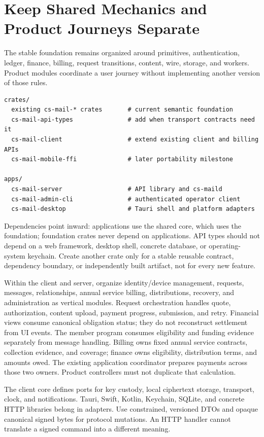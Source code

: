 \documentclass[11pt]{article}
\begin{document}
\section{Keep Shared Mechanics and Product Journeys Separate}

The stable foundation remains organized around primitives, authentication,
ledger, finance, billing, request transitions, content, wire, storage, and workers. Product modules
coordinate a user journey without implementing another version of those rules.

\begin{lstlisting}[language={}]
crates/
  existing cs-mail-* crates       # current semantic foundation
  cs-mail-api-types               # add when transport contracts need it
  cs-mail-client                  # extend existing client and billing APIs
  cs-mail-mobile-ffi              # later portability milestone

apps/
  cs-mail-server                  # API library and cs-maild
  cs-mail-admin-cli               # authenticated operator client
  cs-mail-desktop                 # Tauri shell and platform adapters
\end{lstlisting}

Dependencies point inward: applications use the shared core, which uses the
foundation; foundation crates never depend on applications. API types should not
depend on a web framework, desktop shell, concrete database, or operating-system
keychain. Create another crate only for a stable reusable contract, dependency
boundary, or independently built artifact, not for every new feature.

Within the client and server, organize identity/device management, requests,
messages, relationships, annual service billing, distributions, recovery, and
administration as vertical modules. Request orchestration handles quote,
authorization, content upload, payment progress, submission, and retry. Financial
views consume canonical obligation status; they do not reconstruct settlement
from UI events. The member program consumes eligibility and funding evidence
separately from message handling. Billing owns fixed annual service contracts,
collection evidence, and coverage; finance owns eligibility, distribution terms,
and amounts owed. The existing
application coordinator prepares payments across those two owners. Product
controllers must not duplicate that calculation.

The client core defines ports for key custody, local ciphertext storage,
transport, clock, and notifications. Tauri, Swift, Kotlin, Keychain, SQLite, and
concrete HTTP libraries belong in adapters. Use constrained, versioned DTOs and
opaque canonical signed bytes for protocol mutations. An HTTP handler cannot
translate a signed command into a different meaning.
\end{document}
